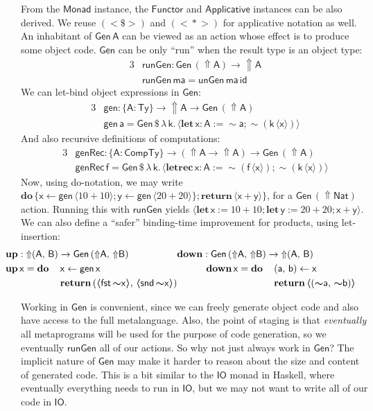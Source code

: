 \documentclass[acmsmall,screen,review,anonymous]{acmart}
\newcommand{\mit}[1]{{\mathsf{#1}}}
\newcommand{\msf}[1]{{\mathsf{#1}}}
\newcommand{\mbf}[1]{{\mathbf{#1}}}
\newcommand{\bs}[1]{\boldsymbol{#1}}
\newcommand{\mdo}{\mbf{do}\,}
\newcommand{\ind}{\hspace{1em}}
\newcommand{\return}{\mbf{return}\,}
\newcommand{\lam}{\lambda\,}
\newcommand{\letrec}{\mbf{letrec}\,}
\newcommand{\letdef}{\mbf{let\,}}
\newcommand{\vma}{\mathsf{ma}}
\newcommand{\vk}{\mathsf{k}}
\newcommand{\vA}{\mathsf{A}}
\newcommand{\vB}{\mathsf{B}}
\newcommand{\va}{\mathsf{a}}
\newcommand{\vb}{\mathsf{b}}
\newcommand{\vx}{\mathsf{x}}
\newcommand{\vy}{\mathsf{y}}
\newcommand{\vf}{\mathsf{f}}
\newcommand{\Monad}{\msf{Monad}}
\newcommand{\Applicative}{\msf{Applicative}}
\newcommand{\Functor}{\msf{Functor}}
\newcommand{\fro}{\leftarrow}
\newcommand{\Up}{{\Uparrow}}
\newcommand{\spl}{{\bs{\sim}}}
\newcommand{\ql}{{\bs{\langle}}}
\newcommand{\qr}{{\bs{\rangle}}}
\newcommand{\Ty}{\msf{Ty}}
\newcommand{\CTy}{\msf{CompTy}}
\newcommand{\fst}{\msf{fst}}
\newcommand{\snd}{\msf{snd}}
\newcommand{\Nat}{\msf{Nat}}
\theoremstyle{remark}
\newcommand{\id}{\mit{id}}
\newcommand{\mup}{\mbf{up}}
\newcommand{\mdown}{\mbf{down}}
\newcommand{\Gen}{\msf{Gen}}
\newcommand{\unGen}{\mit{unGen}}
\newcommand{\gen}{\mit{gen}}
\newcommand{\genRec}{\mit{genRec}}
\newcommand{\fmap}{<\!\!\$\!\!>}
\newcommand{\ap}{{<\!\!*\!\!>}}
\newcommand{\runGen}{\mit{runGen}}
\newcommand{\qt}[1]{\ql#1\qr}
\newcommand{\dlr}{\,\$\,}
\begin{document}
From the $\Monad$ instance, the $\Functor$ and $\Applicative$ instances can be
also derived. We reuse $({\fmap})$ and $({\ap})$ for applicative notation as well.
An inhabitant of $\Gen\,\vA$ can be viewed as an action whose effect is to produce
some object code. $\Gen$ can be only ``run'' when the result type is an object
type:
\begin{alignat*}{3}
  &\runGen : \Gen\,(\Up \vA) \to \Up \vA\\
  &\runGen\,\vma = \unGen\,\vma\,\id
\end{alignat*}
We can let-bind object expressions in $\Gen$:
\begin{alignat*}{3}
  & \gen : \{\vA : \Ty\} \to \Up \vA \to \Gen\,(\Up \vA) \\
  & \gen\,\va = \Gen \dlr \lam \vk.\,\ql \letdef \vx : \vA := \spl \va; \spl(\vk\,\ql \vx \qr) \qr
\end{alignat*}
And also recursive definitions of computations:
\begin{alignat*}{3}
  & \genRec : \{\vA : \CTy\} \to (\Up \vA \to \Up \vA) \to \Gen\,(\Up \vA) \\
  & \genRec\,\vf = \Gen \dlr \lam \vk.\,\qt{\letrec \vx : \vA := \spl(\vf\,\qt{\vx}); \spl(\vk\,\qt{\vx})}
\end{alignat*}
Now, using do-notation, we may write $\mdo \{\vx \fro \gen\,\qt{10 + 10}; \vy \fro
\gen\,\qt{20 + 20}\};\return \qt{\vx + \vy}\}$, for a $\Gen\,(\Up \Nat)$
action. Running this with $\runGen$ yields $\qt{\letdef \vx := 10 + 10; \letdef \vy
  := 20 + 20; \vx + \vy}$. We can also define a ``safer'' binding-time improvement for
products, using let-insertion:
\begin{alignat*}{6}
  &\hspace{-2em}\mathrlap{\mup : \Up (\vA,\,\vB) \to \Gen\,(\Up \vA,\,\Up \vB)            \hspace{5em} \mdown : \Gen\,(\Up \vA,\, \Up \vB) \to \Up(\vA,\,\vB)} \\
  &\hspace{-2em}\mup\,\vx = \mdo &&\vx \fro \gen\,\vx                                    && \ind\ind \mdown\,\vx = \mdo &&(\va,\,\vb) \fro \vx\\
  &\hspace{-2em}               &&\return (\qt{\fst\,\spl \vx},\,\qt{\snd\,\spl \vx})     &&                           &&\return \qt{(\spl \va,\, \spl \vb)}
\end{alignat*}

Working in $\Gen$ is convenient, since we can freely generate object code and
also have access to the full metalanguage. Also, the point of staging is that
\emph{eventually} all metaprograms will be used for the purpose of code
generation, so we eventually $\runGen$ all of our actions. So why not
just always work in $\Gen$? The implicit nature of $\Gen$ may make it harder to
reason about the size and content of generated code. This is a bit similar to
the $\msf{IO}$ monad in Haskell, where eventually everything needs to run in
$\msf{IO}$, but we may not want to write all of our code in $\msf{IO}$.
\end{document}
